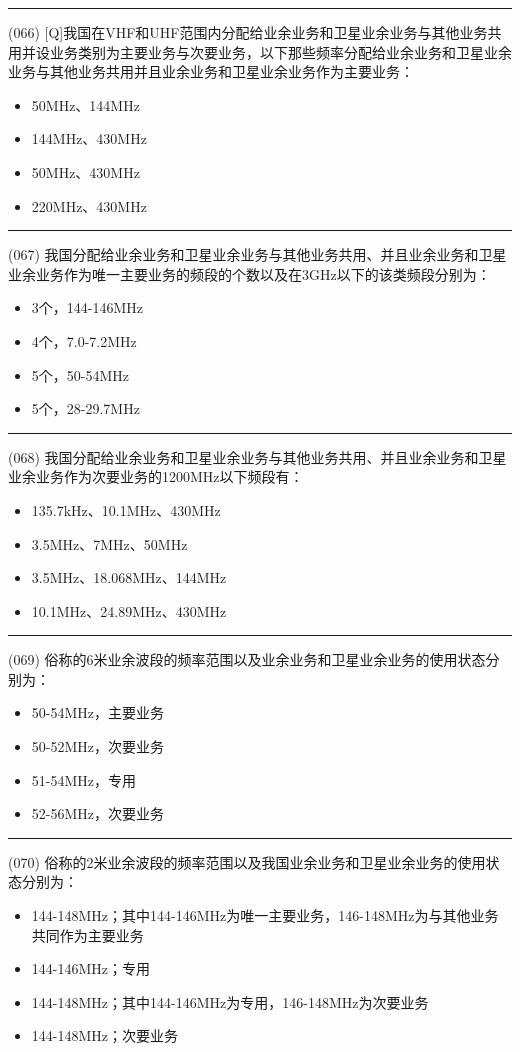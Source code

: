 \documentclass[twocolumn]{ctexart}  %
\begin{document}
\noindent\rule{0.5\textwidth}{1pt}
\heiti (066) [Q]我国在VHF和UHF范围内分配给业余业务和卫星业余业务与其他业务共用并设业务类别为主要业务与次要业务，以下那些频率分配给业余业务和卫星业余业务与其他业务共用并且业余业务和卫星业余业务作为主要业务：  \songti {\color{gray} [LK0146] }
\begin{itemize}
	\item  50MHz、144MHz
	\item  144MHz、430MHz
	\item  50MHz、430MHz
	\item  220MHz、430MHz
\end{itemize}


\noindent\rule{0.5\textwidth}{1pt}
\heiti (067) 我国分配给业余业务和卫星业余业务与其他业务共用、并且业余业务和卫星业余业务作为唯一主要业务的频段的个数以及在3GHz以下的该类频段分别为： \songti {\color{gray} [LK0147] }
\begin{itemize}
	\item  3个，144-146MHz
	\item  4个，7.0-7.2MHz
	\item  5个，50-54MHz
	\item  5个，28-29.7MHz
\end{itemize}


\noindent\rule{0.5\textwidth}{1pt}
\heiti (068) 我国分配给业余业务和卫星业余业务与其他业务共用、并且业余业务和卫星业余业务作为次要业务的1200MHz以下频段有： \songti {\color{gray} [LK0148] }
\begin{itemize}
	\item  135.7kHz、10.1MHz、430MHz
	\item  3.5MHz、7MHz、50MHz
	\item  3.5MHz、18.068MHz、144MHz
	\item  10.1MHz、24.89MHz、430MHz
\end{itemize}


\noindent\rule{0.5\textwidth}{1pt}
\heiti (069) 俗称的6米业余波段的频率范围以及业余业务和卫星业余业务的使用状态分别为： \songti {\color{gray} [LK0157] }
\begin{itemize}
	\item  50-54MHz，主要业务
	\item  50-52MHz，次要业务
	\item  51-54MHz，专用
	\item  52-56MHz，次要业务
\end{itemize}


\noindent\rule{0.5\textwidth}{1pt}
\heiti (070) 俗称的2米业余波段的频率范围以及我国业余业务和卫星业余业务的使用状态分别为： \songti {\color{gray} [LK0158] }
\begin{itemize}
	\item  144-148MHz；其中144-146MHz为唯一主要业务，146-148MHz为与其他业务共同作为主要业务
	\item  144-146MHz；专用
	\item  144-148MHz；其中144-146MHz为专用，146-148MHz为次要业务
	\item  144-148MHz；次要业务
\end{itemize}
\end{document}
